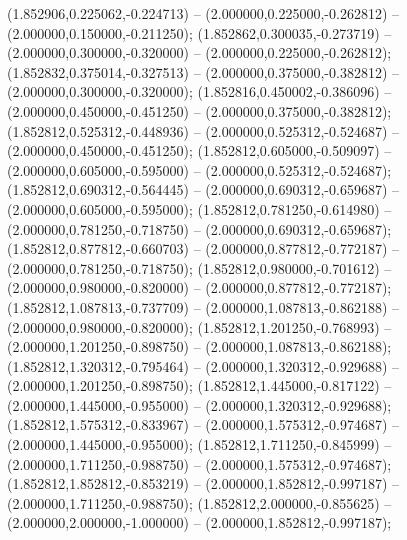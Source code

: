  (1.852906,0.225062,-0.224713) -- (2.000000,0.225000,-0.262812) -- (2.000000,0.150000,-0.211250);
 (1.852862,0.300035,-0.273719) -- (2.000000,0.300000,-0.320000) -- (2.000000,0.225000,-0.262812);
 (1.852832,0.375014,-0.327513) -- (2.000000,0.375000,-0.382812) -- (2.000000,0.300000,-0.320000);
 (1.852816,0.450002,-0.386096) -- (2.000000,0.450000,-0.451250) -- (2.000000,0.375000,-0.382812);
 (1.852812,0.525312,-0.448936) -- (2.000000,0.525312,-0.524687) -- (2.000000,0.450000,-0.451250);
 (1.852812,0.605000,-0.509097) -- (2.000000,0.605000,-0.595000) -- (2.000000,0.525312,-0.524687);
 (1.852812,0.690312,-0.564445) -- (2.000000,0.690312,-0.659687) -- (2.000000,0.605000,-0.595000);
 (1.852812,0.781250,-0.614980) -- (2.000000,0.781250,-0.718750) -- (2.000000,0.690312,-0.659687);
 (1.852812,0.877812,-0.660703) -- (2.000000,0.877812,-0.772187) -- (2.000000,0.781250,-0.718750);
 (1.852812,0.980000,-0.701612) -- (2.000000,0.980000,-0.820000) -- (2.000000,0.877812,-0.772187);
 (1.852812,1.087813,-0.737709) -- (2.000000,1.087813,-0.862188) -- (2.000000,0.980000,-0.820000);
 (1.852812,1.201250,-0.768993) -- (2.000000,1.201250,-0.898750) -- (2.000000,1.087813,-0.862188);
 (1.852812,1.320312,-0.795464) -- (2.000000,1.320312,-0.929688) -- (2.000000,1.201250,-0.898750);
 (1.852812,1.445000,-0.817122) -- (2.000000,1.445000,-0.955000) -- (2.000000,1.320312,-0.929688);
 (1.852812,1.575312,-0.833967) -- (2.000000,1.575312,-0.974687) -- (2.000000,1.445000,-0.955000);
 (1.852812,1.711250,-0.845999) -- (2.000000,1.711250,-0.988750) -- (2.000000,1.575312,-0.974687);
 (1.852812,1.852812,-0.853219) -- (2.000000,1.852812,-0.997187) -- (2.000000,1.711250,-0.988750);
 (1.852812,2.000000,-0.855625) -- (2.000000,2.000000,-1.000000) -- (2.000000,1.852812,-0.997187);
